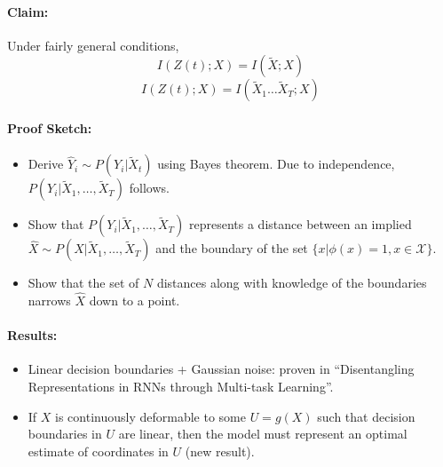 \documentclass[12pt]{article}
\begin{document}
\paragraph{Claim: } Under fairly general conditions,
\begin{equation}
	I(Z(t); X) = I(\tilde X; X)
\end{equation}
\begin{equation}
	I(Z(t); X) = I(\tilde X_1 \dots \tilde X_T; X)
\end{equation}


\paragraph{Proof Sketch: }
\begin{itemize}
	\item Derive $\hat Y_i \sim P(Y_i | \tilde X_t)$ using Bayes theorem. Due to independence, $P(Y_i | \tilde X_1, \dots, \tilde X_T)$ follows. 
	\item Show that $P(Y_i | \tilde X_1, \dots, \tilde X_T)$ represents a distance between an implied $\hat X \sim P(X | \tilde X_1, \dots, \tilde X_T)$ and the boundary of the set $\{x | \phi(x) = 1, x\in \mathcal X\}$.
	\item Show that the set of $N$ distances along with knowledge of the boundaries narrows $\hat X$ down to a point.
\end{itemize}


\paragraph{Results: }
\begin{itemize}
	\item Linear decision boundaries + Gaussian noise: proven in ``Disentangling Representations in RNNs through Multi-task Learning''. 
	\item If $X$ is continuously deformable to some $U = g(X)$ such that decision boundaries in $U$ are linear, then the model must represent an optimal estimate of coordinates in $U$ (new result).
\end{itemize}
\end{document}
